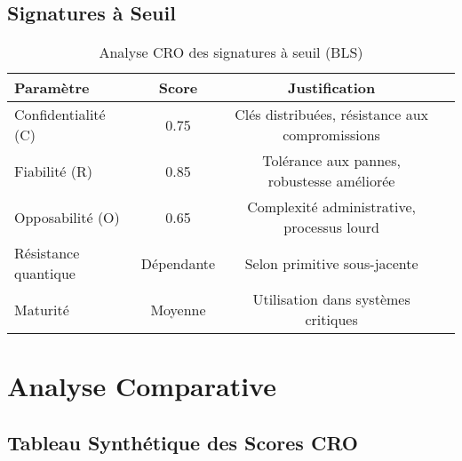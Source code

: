 \subsection{Signatures à Seuil}
\begin{table}[H]
\centering
\begin{tabular}{lccc}
\hline
\textbf{Paramètre} & \textbf{Score} & \textbf{Justification} \\
\hline
Confidentialité (C) & 0.75 & Clés distribuées, résistance aux compromissions \\
Fiabilité (R) & 0.85 & Tolérance aux pannes, robustesse améliorée \\
Opposabilité (O) & 0.65 & Complexité administrative, processus lourd \\
Résistance quantique & Dépendante & Selon primitive sous-jacente \\
Maturité & Moyenne & Utilisation dans systèmes critiques \\
\hline
\end{tabular}
\caption{Analyse CRO des signatures à seuil (BLS)}
\end{table}

\section{Analyse Comparative}
\subsection{Tableau Synthétique des Scores CRO}
\begin{table}[H]
\centering
{}
\caption{Comparaison des primitives cryptographiques selon le Trilemme CRO}
\end{table}

